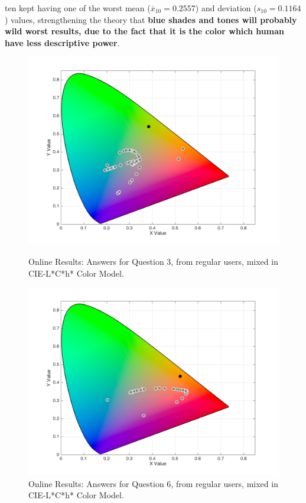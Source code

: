 ten kept having one of the worst mean ($\overline{x}_{10} = 0.2557$) and deviation ($s_{10} = 0.1164$) values, strengthening the theory that \textbf{blue shades and tones will probably wild worst results, due to the fact
that it is the color which human have less descriptive power}. \par
%
\begin{figure}[!htbp]
  \centering
  \begin{minipage}{0.48\textwidth}
    \centering
    \includegraphics[width=\textwidth]{images/results/3_online_LChresponses.png}
    \caption[Online Results: Answers for Question 3, from regular users, mixed in CIE-L*C*h* Color Model.]{Online Results: Answers for Question 3, from regular users, mixed in CIE-L*C*h* Color Model.}
    \label{fig:onlinelchregular_3}
  \end{minipage}\hfill
  \begin{minipage}{0.48\textwidth}
    \centering
    \includegraphics[width=\textwidth]{images/results/6_online_LChresponses.png}
    \caption[Online Results: Answers for Question 6, from regular users, mixed in CIE-L*C*h* Color Model.]{Online Results: Answers for Question 6, from regular users, mixed in CIE-L*C*h* Color Model.}
    \label{fig:onlinelchregular_6}
  \end{minipage}
\end{figure}
